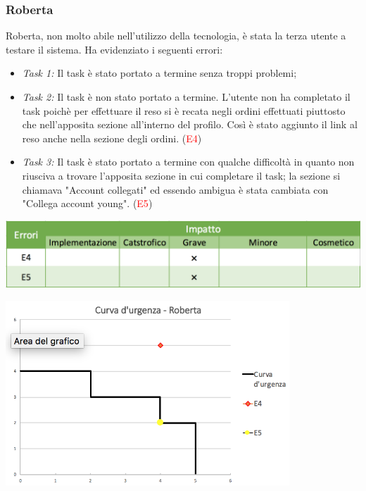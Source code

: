 \documentclass[12pt,a4paper]{report}
\begin{document}
  \subsubsection{Roberta}
  Roberta, non molto abile nell'utilizzo della tecnologia, è stata la terza utente a testare il sistema. Ha evidenziato i seguenti errori:
  \begin{itemize}
    \item \textit{Task 1:} Il task è stato portato a termine senza troppi problemi;
    \item \textit{Task 2:} Il task è non stato portato a termine. L'utente non ha completato il task poichè per effettuare il reso si è recata negli ordini effettuati piuttosto che nell'apposita sezione all'interno del profilo. Così è stato aggiunto il link al reso anche nella sezione degli ordini. (\textcolor{red}{E4})
    \item \textit{Task 3:} Il task è stato portato a termine con qualche difficoltà in quanto non riusciva a trovare l'apposita sezione in cui completare il task; la sezione si chiamava "Account collegati" ed essendo ambigua è stata cambiata con "Collega account young". (\textcolor{red}{E5})
  \end{itemize}
  \includegraphics[width=1\textwidth]{"Project Management Sources/ImpattoRoberta"}
  \begin{center}
    \includegraphics[width=0.8\textwidth]{"Project Management Sources/UrgenzaRoberta"}
  \end{center}
\end{document}
